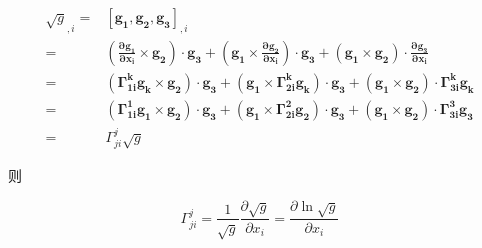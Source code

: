 \documentclass[UTF8,zihao=5]{ctexart}
\newcommand*{\pd}[2]{\frac{\partial #1}{\partial #2}}
\begin{document}
\begin{equation*}
    \begin{split}
        \sqrt{g}_{,i}
        =&\bm{[g_1,g_2,g_3]}_{,i}
        \\=&
        \bm{(\pd{g_{1}}{x_i}\times g_2)\cdot g_3}
        +\bm{(g_{1}\times \pd{g_{2}}{x_i})\cdot g_3}
        +\bm{(g_{1}\times g_2)\cdot \pd{g_{3}}{x_i}}
        \\=&
        \bm{(\Gamma^{k}_{1i}g_k\times g_2)\cdot g_3}
        +\bm{(g_{1}\times \Gamma^{k}_{2i}g_k)\cdot g_3}
        +\bm{(g_{1}\times g_2)\cdot \Gamma^{k}_{3i}g_k}
        \\=&
        \bm{(\Gamma^{1}_{1i}g_1\times g_2)\cdot g_3}
        +\bm{(g_{1}\times \Gamma^{2}_{2i}g_2)\cdot g_3}
        +\bm{(g_{1}\times g_2)\cdot \Gamma^{3}_{3i}g_3}
        \\=&
        \Gamma^{j}_{ji}\sqrt{g}
    \end{split}
\end{equation*}

则

$$
\Gamma^{j}_{ji}=\frac{1}{\sqrt{g}}\pd{\sqrt{g}}{x_i}
=\pd{\ln{\sqrt{g}}}{x_i}
$$
\end{document}
